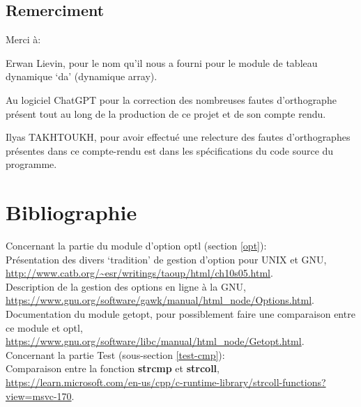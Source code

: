 \documentclass[12pt]{article}
\begin{document}
    \subsection{Remerciment}

    Merci à\@: 

    Erwan Lievin, pour le nom qu'il nous a fourni pour le module de tableau 
    dynamique `da' (dynamique array).

    Au logiciel ChatGPT pour la correction des nombreuses fautes d'orthographe 
    présent tout au long de la production de ce projet et de son compte rendu.

    Ilyas TAKHTOUKH, pour avoir effectué une relecture des fautes 
    d'orthographes présentes dans ce compte-rendu est dans les spécifications du 
    code source du programme. 

    \newpage

    \section{Bibliographie}
        \noindent Concernant la partie du module d'option optl 
        (section \ref{opt}):\\ Présentation des divers `tradition' de gestion 
        d'option pour UNIX et GNU, 
        \url{http://www.catb.org/~esr/writings/taoup/html/ch10s05.html}.\\
        Description de la gestion des options en ligne à la GNU, 
        \url{https://www.gnu.org/software/gawk/manual/html_node/Options.html}.\\
        Documentation du module getopt, pour possiblement faire une comparaison 
        entre ce module et optl, 
        \url{https://www.gnu.org/software/libc/manual/html_node/Getopt.html}.\\
        \noindent Concernant la partie Test (sous-section \ref{test-cmp}):\\
        Comparaison entre la fonction \textbf{strcmp} et \textbf{strcoll}, 
        \url{https://learn.microsoft.com/en-us/cpp/c-runtime-library/strcoll-functions?view=msvc-170}.
\end{document}
